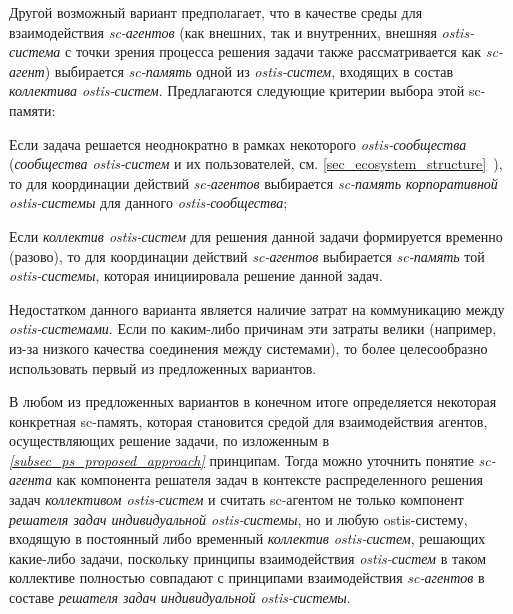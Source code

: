 \begin{textitemize}
	\item Другой возможный вариант предполагает, что в качестве среды для взаимодействия \textit{sc-агентов} (как внешних, так и внутренних, внешняя \textit{ostis-система} с точки зрения процесса решения задачи также рассматривается как \textit{sc-агент}) выбирается \textit{sc-память} одной из \textit{ostis-систем}, входящих в состав \textit{коллектива ostis-систем}. Предлагаются следующие критерии выбора этой sc-памяти:
	\begin{textitemize}
		\item Если задача решается неоднократно в рамках некоторого \textit{ostis-сообщества} (\textit{сообщества ostis-систем} и их пользователей, см. \ref{sec_ecosystem_structure}~), то для координации действий \textit{sc-агентов} выбирается \textit{sc-память} \textit{корпоративной ostis-системы} для данного \textit{ostis-сообщества};
		\item Если \textit{коллектив ostis-систем} для решения данной задачи формируется временно (разово), то для координации действий \textit{sc-агентов} выбирается \textit{sc-память} той \textit{ostis-системы}, которая инициировала решение данной задач.
	\end{textitemize}
	\vspace{-\baselineskip}
	Недостатком данного варианта является наличие затрат на коммуникацию между \textit{ostis-системами}. Если по каким-либо причинам эти затраты велики (например, из-за низкого качества соединения между системами), то более целесообразно использовать первый из предложенных вариантов.
\end{textitemize}

В любом из предложенных вариантов в конечном итоге определяется некоторая конкретная sc-память, которая становится средой для взаимодействия агентов, осуществляющих решение задачи, по изложенным в \textit{\ref{subsec_ps_proposed_approach} } принципам. Тогда можно уточнить понятие \textit{sc-агента} как компонента решателя задач в контексте распределенного решения задач \textit{коллективом ostis-систем} и считать sc-агентом не только компонент \textit{решателя задач индивидуальной ostis-системы}, но и любую ostis-систему, входящую в постоянный либо временный \textit{коллектив ostis-систем}, решающих какие-либо задачи, поскольку принципы взаимодействия \textit{ostis-систем} в таком коллективе полностью совпадают с принципами взаимодействия \textit{sc-агентов} в составе \textit{решателя задач} \textit{индивидуальной ostis-системы}.

